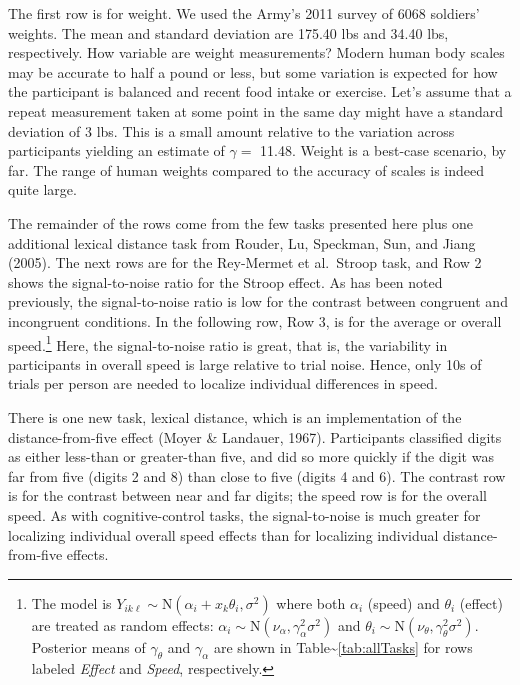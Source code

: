 \documentclass[
  ,man]{apa6}
\begin{document}
The first row is for weight. We used the Army's 2011 survey of 6068 soldiers' weights. The mean and standard deviation are 175.40 lbs and 34.40 lbs, respectively. How variable are weight measurements? Modern human body scales may be accurate to half a pound or less, but some variation is expected for how the participant is balanced and recent food intake or exercise. Let's assume that a repeat measurement taken at some point in the same day might have a standard deviation of 3 lbs. This is a small amount relative to the variation across participants yielding an estimate of \(\gamma =\) 11.48. Weight is a best-case scenario, by far. The range of human weights compared to the accuracy of scales is indeed quite large.

The remainder of the rows come from the few tasks presented here plus one additional lexical distance task from Rouder, Lu, Speckman, Sun, and Jiang (2005). The next rows are for the Rey-Mermet et al.~Stroop task, and Row 2 shows the signal-to-noise ratio for the Stroop effect. As has been noted previously, the signal-to-noise ratio is low for the contrast between congruent and incongruent conditions. In the following row, Row 3, is for the average or overall speed.\footnote{The model is \(Y_{ik\ell} \sim \mbox{N}(\alpha_i+x_k\theta_i,\sigma^2)\) where both \(\alpha_i\) (speed) and \(\theta_i\) (effect) are treated as random effects: \(\alpha_i \sim \mbox{N}(\nu_\alpha,\gamma^2_\alpha\sigma^2)\) and \(\theta_i \sim \mbox{N}(\nu_\theta,\gamma^2_\theta\sigma^2)\). Posterior means of \(\gamma_\theta\) and \(\gamma_\alpha\) are shown in Table\textasciitilde{}\ref{tab:allTasks} for rows labeled \emph{Effect} and \emph{Speed}, respectively.} Here, the signal-to-noise ratio is great, that is, the variability in participants in overall speed is large relative to trial noise. Hence, only 10s of trials per person are needed to localize individual differences in speed.

There is one new task, lexical distance, which is an implementation of the distance-from-five effect (Moyer \& Landauer, 1967). Participants classified digits as either less-than or greater-than five, and did so more quickly if the digit was far from five (digits 2 and 8) than close to five (digits 4 and 6). The contrast row is for the contrast between near and far digits; the speed row is for the overall speed. As with cognitive-control tasks, the signal-to-noise is much greater for localizing individual overall speed effects than for localizing individual distance-from-five effects.
\end{document}
